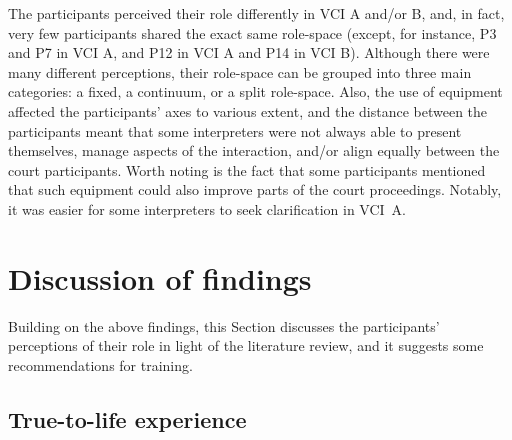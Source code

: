 \documentclass[output=paper]{langsci/langscibook}
\begin{document}
The participants perceived their role differently in VCI A and/or B, and, in fact, very few participants shared the exact same role-space (except, for instance, P3 and P7 in VCI A, and P12 in VCI A and P14 in VCI B). Although there were many different perceptions, their role-space can be grouped into three main categories: a fixed, a continuum, or a split role-space. Also, the use of equipment affected the participants’ axes to various extent, and the distance between the participants meant that some interpreters were not always able to present themselves, manage aspects of the interaction, and/or align equally between the court participants. Worth noting is the fact that some participants mentioned that such equipment could also improve parts of the court proceedings. Notably, it was easier for some interpreters to seek clarification in VCI~A. 

\section{Discussion of findings}

Building on the above findings, this Section discusses the participants’ perceptions of their role in light of the literature review, and it suggests some recommendations for training.

\subsection{True-to-life experience}
\end{document}
